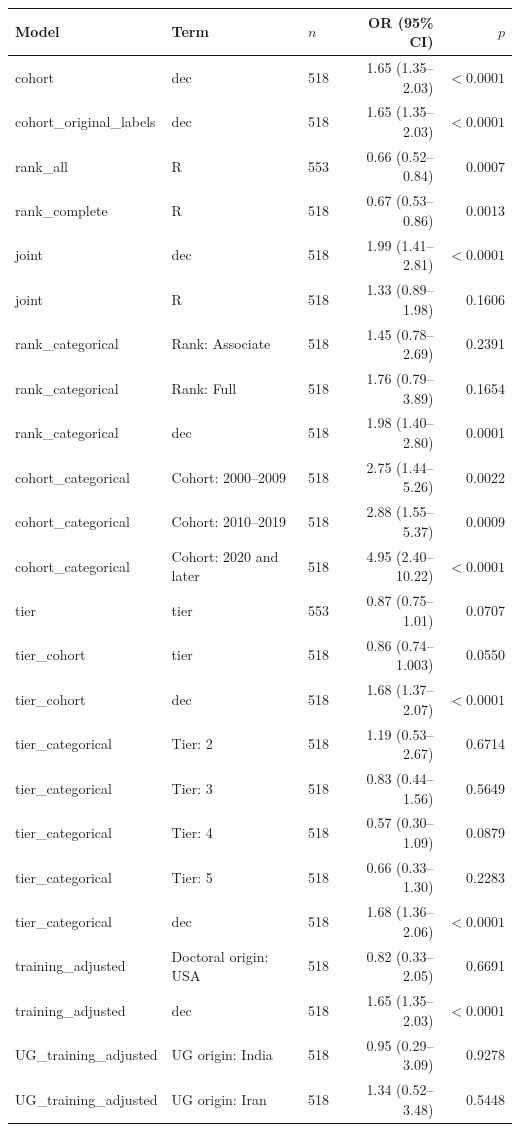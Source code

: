 \begin{tabular}{lllrr}
\toprule
Model & Term & $n$ & OR (95\% CI) & $p$ \\
\midrule
cohort & dec & 518 & 1.65 (1.35--2.03) & $<0.0001$ \\
cohort\_original\_labels & dec & 518 & 1.65 (1.35--2.03) & $<0.0001$ \\
rank\_all & R & 553 & 0.66 (0.52--0.84) & 0.0007 \\
rank\_complete & R & 518 & 0.67 (0.53--0.86) & 0.0013 \\
joint & dec & 518 & 1.99 (1.41--2.81) & $<0.0001$ \\
joint & R & 518 & 1.33 (0.89--1.98) & 0.1606 \\
rank\_categorical & Rank: Associate & 518 & 1.45 (0.78--2.69) & 0.2391 \\
rank\_categorical & Rank: Full & 518 & 1.76 (0.79--3.89) & 0.1654 \\
rank\_categorical & dec & 518 & 1.98 (1.40--2.80) & 0.0001 \\
cohort\_categorical & Cohort: 2000--2009 & 518 & 2.75 (1.44--5.26) & 0.0022 \\
cohort\_categorical & Cohort: 2010--2019 & 518 & 2.88 (1.55--5.37) & 0.0009 \\
cohort\_categorical & Cohort: 2020 and later & 518 & 4.95 (2.40--10.22) & $<0.0001$ \\
tier & tier & 553 & 0.87 (0.75--1.01) & 0.0707 \\
tier\_cohort & tier & 518 & 0.86 (0.74--1.003) & 0.0550 \\
tier\_cohort & dec & 518 & 1.68 (1.37--2.07) & $<0.0001$ \\
tier\_categorical & Tier: 2 & 518 & 1.19 (0.53--2.67) & 0.6714 \\
tier\_categorical & Tier: 3 & 518 & 0.83 (0.44--1.56) & 0.5649 \\
tier\_categorical & Tier: 4 & 518 & 0.57 (0.30--1.09) & 0.0879 \\
tier\_categorical & Tier: 5 & 518 & 0.66 (0.33--1.30) & 0.2283 \\
tier\_categorical & dec & 518 & 1.68 (1.36--2.06) & $<0.0001$ \\
training\_adjusted & Doctoral origin: USA & 518 & 0.82 (0.33--2.05) & 0.6691 \\
training\_adjusted & dec & 518 & 1.65 (1.35--2.03) & $<0.0001$ \\
UG\_training\_adjusted & UG origin: India & 518 & 0.95 (0.29--3.09) & 0.9278 \\
UG\_training\_adjusted & UG origin: Iran & 518 & 1.34 (0.52--3.48) & 0.5448 \\

\end{tabular}

